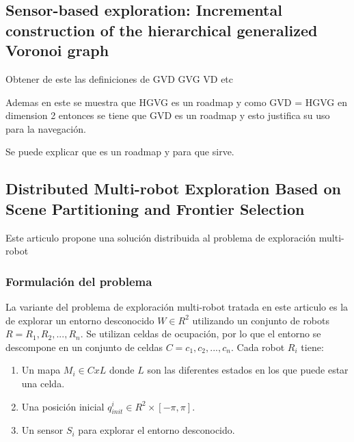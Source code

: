 \subsection{Sensor-based exploration: Incremental construction of the hierarchical generalized Voronoi graph}

Obtener de este las definiciones de GVD GVG VD etc

Ademas en este se muestra que HGVG es un roadmap y como GVD = HGVG en dimension 2 entonces se tiene que GVD es un roadmap y esto justifica su uso para la navegación.

Se puede explicar que es un roadmap y para que sirve.


\subsection{Distributed Multi-robot Exploration Based on Scene Partitioning and Frontier Selection}

Este articulo propone una solución distribuida al problema de exploración multi-robot%

\subsubsection{Formulación del problema}
La variante del problema de exploración multi-robot tratada en este articulo es la de explorar un entorno desconocido $W\in R^2$ utilizando un conjunto de robots $R={R_1,R_2,...,R_n}$. Se utilizan celdas de ocupación, por lo que el entorno se descompone en un conjunto de celdas $C={c_1,c_2,...,c_n}$. Cada robot $R_i$ tiene:
\begin{enumerate}
  \item Un mapa $M_i \in CxL$ donde $L$ son las diferentes estados en los que puede estar una celda. 
  \item Una posición inicial $q_{init}^{i}\in R^2 \times [-\pi,\pi]$. 
  \item Un sensor $S_i$ para explorar el entorno desconocido.
\end{enumerate}

